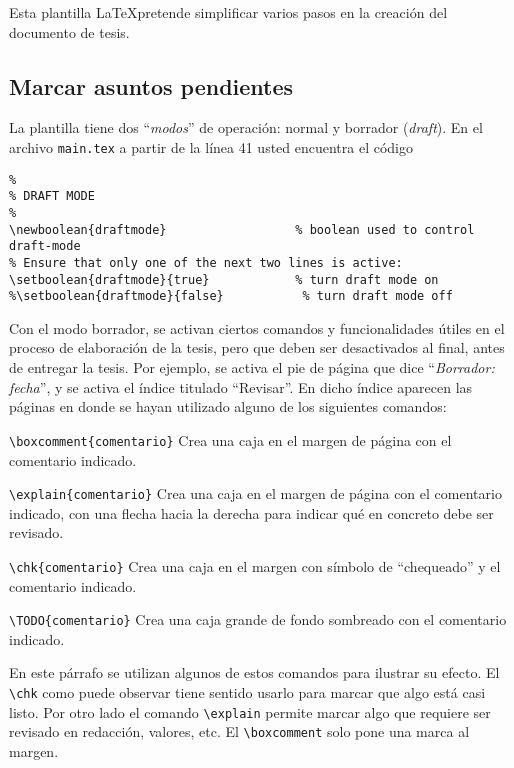 Esta plantilla \LaTeX pretende simplificar varios pasos en la creación del
documento de tesis.

\subsection{Marcar asuntos pendientes}

La plantilla tiene dos ``\emph{modos}'' de operación: normal y borrador
(\emph{draft}).  En el archivo \texttt{main.tex} a partir de la línea 41 usted
encuentra el código

\begin{verbatim}
%
% DRAFT MODE
%
\newboolean{draftmode}                  % boolean used to control draft-mode
% Ensure that only one of the next two lines is active:
\setboolean{draftmode}{true}            % turn draft mode on
%\setboolean{draftmode}{false}           % turn draft mode off
\end{verbatim}

Con el modo borrador, se activan ciertos comandos y funcionalidades útiles en
el proceso de elaboración de la tesis, pero que deben ser desactivados al
final, antes de entregar la tesis.  Por ejemplo, se activa el pie de página que
dice ``\emph{Borrador: fecha}'', y se activa el índice titulado ``Revisar''.  En dicho índice aparecen las páginas en donde se hayan utilizado alguno de los siguientes comandos:
\begin{compactitem}
\item \verb+\boxcomment{comentario}+ Crea una caja en el margen de página con
  el comentario indicado.
\item \verb+\explain{comentario}+ Crea una caja en el margen de página con
  el comentario indicado, con una flecha hacia la derecha para indicar qué en
  concreto debe ser revisado.
\item \verb+\chk{comentario}+ Crea una caja en el margen con símbolo de
  ``chequeado'' y el comentario indicado.
\item \verb+\TODO{comentario}+ Crea una caja grande de fondo sombreado con el
  comentario indicado.
\end{compactitem}

En este párrafo se utilizan algunos de estos comandos
para ilustrar su efecto.  El \verb+\chk+ como puede observar tiene sentido
usarlo para marcar que algo está casi listo.  Por otro lado 
el comando \verb+\explain+ permite marcar algo que requiere ser revisado en
redacción, valores, etc.  El \verb+\boxcomment+
solo pone una marca al margen.

